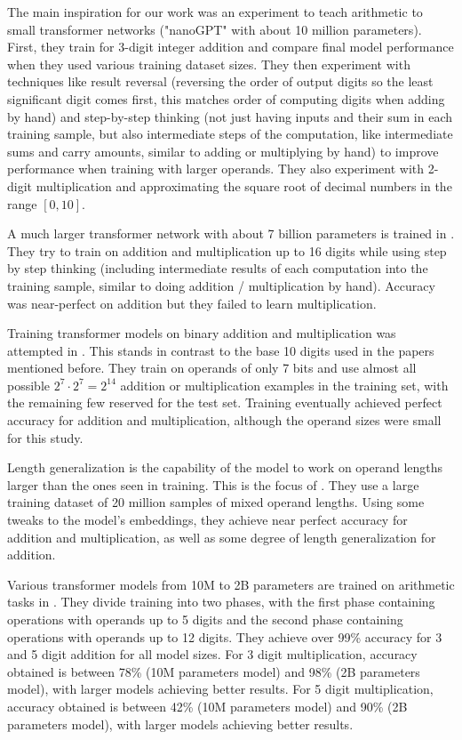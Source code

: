 The main inspiration for our work was an experiment \cite{teaching}  to teach arithmetic to small transformer networks ("nanoGPT" with about 10 million parameters). First, they train for 3-digit integer addition and compare final model performance when they used various training dataset sizes. They then experiment with techniques like result reversal (reversing the order of output digits so the least significant digit comes first, this matches order of computing digits when adding by hand) and step-by-step thinking (not just having inputs and their sum in each training sample, but also intermediate steps of the computation, like intermediate sums and carry amounts, similar to adding or multiplying by hand) to improve performance when training with larger operands. They also experiment with 2-digit multiplication and approximating the square root of decimal numbers in the range $[0,10]$.

A much larger transformer network with about 7 billion parameters is trained in \cite{goat}. They try to train on addition and multiplication up to 16 digits while using step by step thinking (including intermediate results of each computation into the training sample, similar to doing addition / multiplication by hand). Accuracy was near-perfect on addition but they failed to learn multiplication.

Training transformer models on binary addition and multiplication was attempted in \cite{memtocomp}. This stands in contrast to the base 10 digits used in the papers mentioned before. They train on operands of only 7 bits and use almost all possible $2^7 \cdot 2^7 = 2^{14}$ addition or multiplication examples in the training set, with the remaining few reserved for the test set. Training eventually achieved perfect accuracy for addition and multiplication, although the operand sizes were small for this study.

 Length generalization is the capability of the model to work on operand lengths larger than the ones seen in training. This is the focus of \cite{rightembeddings}. They use a large training dataset of 20 million samples of mixed operand lengths. Using some tweaks to the model's embeddings, they achieve near perfect accuracy for addition and multiplication, as well as some degree of length generalization for addition.

Various transformer models from 10M to 2B parameters are trained on arithmetic tasks in \cite{nocalculator}. They divide training into two phases, with the first phase containing operations with operands up to 5 digits and the second phase containing operations with operands up to 12 digits. They achieve over 99\% accuracy for 3 and 5 digit addition for all model sizes. For 3 digit multiplication, accuracy obtained is between 78\% (10M parameters model) and 98\% (2B parameters model), with larger models achieving better results.
For 5 digit multiplication, accuracy obtained is between 42\% (10M parameters model) and 90\% (2B parameters model), with larger models achieving better results.

